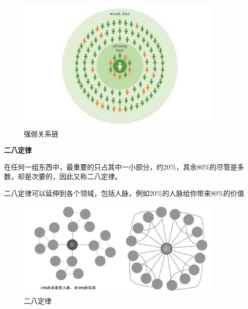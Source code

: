 \begin{frame}

	\begin{figure}[htbp]
		\centering
		\includegraphics[width=0.9\textwidth]{pic/t4.jpg}
		\caption{强弱关系链}
	\end{figure}

\end{frame}


\begin{frame}
	\textbf{二八定律}
	
	在任何一组东西中，最重要的只占其中一小部分，约20\%，其余80\%的尽管是多数，却是次要的，因此又称二八定律。
	
	二八定律可以延伸到各个领域，包括人脉，例如20\%的人脉给你带来80\%的价值

\end{frame}

\begin{frame}

	\begin{figure}[htbp]
		\centering
		\includegraphics[width=0.9\textwidth]{pic/t5.jpg}
		\caption{二八定律}
	\end{figure}

\end{frame}

